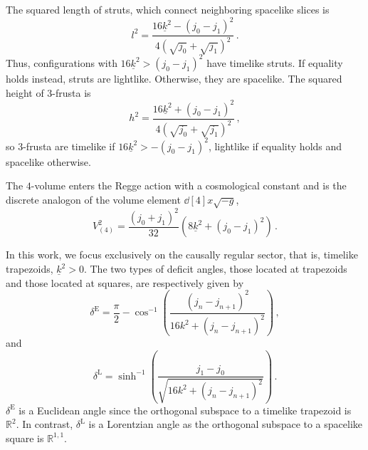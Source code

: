 \documentclass[amsmath,amssymb,aps,twocolumn,superscriptaddress,nofootinbib]{revtex4-1}
\newcommand{\R}{\mathbb{R}}
\begin{document}
The squared length of struts, which connect neighboring spacelike slices is
%
\begin{equation}
l^2 = \frac{16\underline{k}^2-(j_0-j_1)^2}{4(\sqrt{j_0} + \sqrt{j_1})^2}\,.
\end{equation}
%
Thus, configurations with $16\underline{k}^2 > (j_0-j_1)^2$ have timelike struts. 
If equality holds instead, struts are lightlike. 
Otherwise, they are spacelike.
The squared height of $3$-frusta is
%
\begin{equation}
h^2 = \frac{16\underline{k}^2 + (j_0-j_1)^2}{4(\sqrt{j_0} + \sqrt{j_1})^2}\,,
\end{equation}
%
so $3$-frusta are timelike if $16\underline{k}^2>-(j_0-j_1)^2$, lightlike if equality holds and spacelike otherwise.

The $4$-volume enters the Regge action with a cosmological constant and is the discrete analogon of the volume element $\dd[4]{x}\sqrt{-g}$,
% 
\begin{equation}\label{eq:4-volume}
V_{(4)}^2 = \frac{(j_0+j_1)^2}{32}\left(8\underline{k}^2 + (j_0-j_1)^2\right)\,.
\end{equation}
%

In this work, we focus exclusively on the causally regular sector, that is, timelike trapezoids, $\underline{k}^2 > 0$. 
The two types of deficit angles, those located at trapezoids and those located at squares, are respectively given by
%
\begin{equation}
\delta^{\mathrm{E}} = \frac{\pi}{2} - \cos^{-1}\left(\frac{(j_n - j_{n+1})^2}{16k^2 + (j_n - j_{n+1})^2}\right)\,,
\end{equation}
%
and 
%
\begin{equation}
\delta^{\mathrm{L}} = \sinh^{-1}\left(\frac{j_1-j_0}{\sqrt{16k^2 + (j_n - j_{n+1})^2}}\right)\,.
\end{equation}
%
$\delta^{\mathrm{E}}$ is a Euclidean angle since the orthogonal subspace to a timelike trapezoid is $\R^2$.
In contrast, $\delta^{\mathrm{L}}$ is a Lorentzian angle as the orthogonal subspace to a spacelike square is $\R^{1,1}$.
\end{document}
